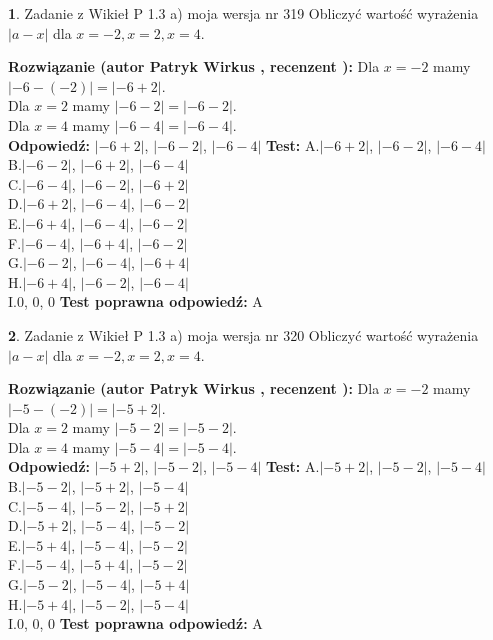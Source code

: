 \documentclass[12pt, a4paper]{article}
\theoremstyle{definition} %
\newtheorem{zad}{}
\newcommand{\zadStart}[1]{\begin{zad}#1\newline}
\newcommand{\zadStop}{\end{zad}}
\newcommand{\rozwStart}[2]{\noindent \textbf{Rozwiązanie (autor #1 , recenzent #2): }\newline}
\newcommand{\rozwStop}{\newline}
\newcommand{\odpStart}{\noindent \textbf{Odpowiedź:}\newline}
\newcommand{\odpStop}{\newline}
\newcommand{\testStart}{\noindent \textbf{Test:}\newline}
\newcommand{\testStop}{\newline}
\newcommand{\kluczStart}{\noindent \textbf{Test poprawna odpowiedź:}\newline}
\newcommand{\kluczStop}{\newline}
\begin{document}
\zadStart{Zadanie z Wikieł P 1.3 a) moja wersja nr 319}
Obliczyć wartość wyrażenia $|a - x|$ dla $x=-2,x=2,x=4$.
\zadStop
\rozwStart{Patryk Wirkus}{}
Dla $x = -2$ mamy $|-6 - (-2)| = |-6 + 2|$.\\
Dla $x = 2$ mamy $|-6 - 2| = |-6 - 2|$.\\
Dla $x = 4$ mamy $|-6 - 4| = |-6 - 4|$.\\
\rozwStop
\odpStart
$|-6 + 2|$, $|-6 - 2|$, $|-6 - 4|$
\odpStop
\testStart
A.$|-6 + 2|$, $|-6 - 2|$, $|-6 - 4|$\\
B.$|-6 - 2|$, $|-6 + 2|$, $|-6 - 4|$\\
C.$|-6 - 4|$, $|-6 - 2|$, $|-6 + 2|$\\
D.$|-6 + 2|$, $|-6 - 4|$, $|-6 - 2|$\\
E.$|-6 + 4|$, $|-6 - 4|$, $|-6 - 2|$\\
F.$|-6 - 4|$, $|-6 + 4|$, $|-6 - 2|$\\
G.$|-6 - 2|$, $|-6 - 4|$, $|-6 + 4|$\\
H.$|-6 + 4|$, $|-6 - 2|$, $|-6 - 4|$\\
I.$0$, $0$, $0$
\testStop
\kluczStart
A
\kluczStop



\zadStart{Zadanie z Wikieł P 1.3 a) moja wersja nr 320}
Obliczyć wartość wyrażenia $|a - x|$ dla $x=-2,x=2,x=4$.
\zadStop
\rozwStart{Patryk Wirkus}{}
Dla $x = -2$ mamy $|-5 - (-2)| = |-5 + 2|$.\\
Dla $x = 2$ mamy $|-5 - 2| = |-5 - 2|$.\\
Dla $x = 4$ mamy $|-5 - 4| = |-5 - 4|$.\\
\rozwStop
\odpStart
$|-5 + 2|$, $|-5 - 2|$, $|-5 - 4|$
\odpStop
\testStart
A.$|-5 + 2|$, $|-5 - 2|$, $|-5 - 4|$\\
B.$|-5 - 2|$, $|-5 + 2|$, $|-5 - 4|$\\
C.$|-5 - 4|$, $|-5 - 2|$, $|-5 + 2|$\\
D.$|-5 + 2|$, $|-5 - 4|$, $|-5 - 2|$\\
E.$|-5 + 4|$, $|-5 - 4|$, $|-5 - 2|$\\
F.$|-5 - 4|$, $|-5 + 4|$, $|-5 - 2|$\\
G.$|-5 - 2|$, $|-5 - 4|$, $|-5 + 4|$\\
H.$|-5 + 4|$, $|-5 - 2|$, $|-5 - 4|$\\
I.$0$, $0$, $0$
\testStop
\kluczStart
A
\kluczStop
\end{document}
